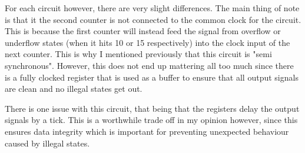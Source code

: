 \documentclass[11pt]{scrartcl}
\begin{document}
\bigskip

For each circuit however, there are very slight differences. The main thing of note is that it the
second counter is not connected to the common clock for the circuit. This is because the first
counter will instead feed the signal from overflow or underflow states (when it hits 10 or 15
respectively) into the clock input of the next counter. This is why I mentioned previously that
this circuit is "semi synchronous". However, this does not end up mattering all too much since
there is a fully clocked register that is used as a buffer to ensure that all output signals are
clean and no illegal states get out.

\bigskip

There is one issue with this circuit, that being that the registers delay the output signals by a
tick. This is a worthwhile trade off in my opinion however, since this ensures data integrity which
is important for preventing unexpected behaviour caused by illegal states.
\end{document}
